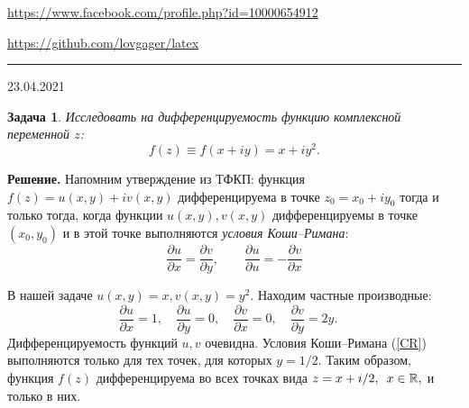 \documentclass[12pt]{article}
\begin{document}


\begin{flushleft}
\url{https://www.facebook.com/profile.php?id=10000654912}

\url{https://github.com/lovgager/latex}
\end{flushleft}
\hrule 
\begin{flushright}
23.04.2021
\end{flushright}
\bigskip


\newtheorem*{task}{Задача}
\begin{task}
Исследовать на дифференцируемость функцию комплексной переменной $z$:
\begin{equation*}
    f(z) \equiv f(x+iy) = x+iy^2.
\end{equation*}
\end{task}

\noindent\textbf{Решение.} 
Напомним утверждение из ТФКП: функция $f(z) = u(x,y) + iv(x,y)$ дифференцируема в точке $z_0=x_0 + iy_0$ тогда и только тогда, когда функции $u(x,y), v(x,y)$ дифференцируемы в точке $(x_0, y_0)$ и в этой точке выполняются \textit{условия Коши--Римана}:
\begin{equation}\label{CR}
    \frac{\partial u}{\partial x} = 
    \frac{\partial v}{\partial y}, \quad\quad
    \frac{\partial u}{\partial u} = 
    -\frac{\partial v}{\partial x}
\end{equation}

В нашей задаче $u(x,y) = x, v(x,y) = y^2$. Находим частные производные:
\begin{equation*}
    \frac{\partial u}{\partial x} = 1, \quad 
    \frac{\partial u}{\partial y} = 0, \quad 
    \frac{\partial v}{\partial x} = 0, \quad 
    \frac{\partial v}{\partial y} = 2y. \quad 
\end{equation*}
Дифференцируемость функций $u, v$ очевидна. Условия Коши--Римана (\ref{CR}) выполняются только для тех точек, для которых $y = 1/2$. Таким образом, функция $f(z)$ дифференцируема во всех точках вида $z = x + i/2, \enskip x\in\mathbb{R},$ и только в них.
\end{document}
